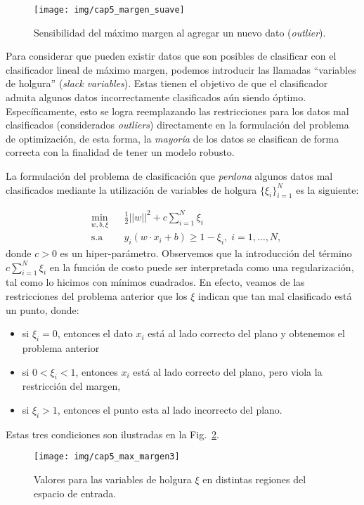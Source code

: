 \begin{figure}[ht]
    \centering
    \texttt{[image: img/cap5\_margen\_suave]}
    \caption{Sensibilidad del máximo margen al agregar un nuevo dato (\emph{outlier}).}
    \label{fig:svm_softmargin}
\end{figure}

Para considerar que pueden existir datos que son posibles de clasificar con el clasificador lineal de máximo margen, podemos introducir las llamadas ``variables de holgura'' (\emph{slack variables}). Estas tienen el objetivo de que el clasificador admita algunos datos incorrectamente clasificados aún siendo óptimo. Específicamente, esto se logra reemplazando las restricciones para los datos mal clasificados (considerados \emph{outliers}) directamente en la formulación del problema de optimización, de esta forma, la \textit{mayoría} de los datos se clasifican de forma correcta con la finalidad de tener un modelo robusto.

La formulación del problema de clasificación que \emph{perdona} algunos datos mal clasificados mediante la utilización de variables de holgura $\{\xi_i\}_{i=1}^N$ es la siguiente:

\begin{equation*}
\begin{aligned}
& \underset{w,b, \xi}{\text{min}}
& & \frac{1}{2}||w||^2 + c\sum\limits_{i=1}^{N} \xi_i \\
& \text{s.a}
& & y_i (w\cdot x_i +b) \geq 1 - \xi_i, \; i = 1, \ldots, N,
\end{aligned}
\end{equation*}
donde $c>0$ es un hiper-parámetro. Observemos que la introducción del término $c\sum\limits_{i=1}^{N} \xi_i$ en la función de costo puede ser interpretada como una regularización, tal como lo hicimos con mínimos cuadrados. En efecto, veamos de las restricciones del problema anterior que los $\xi$ indican que tan mal clasificado está un punto, donde: 
\begin{itemize}
    \item si $\xi_i = 0$, entonces el dato $x_i$ está al lado correcto del plano y obtenemos el problema anterior
    \item si $0<\xi_i <1$, entonces $x_i$ está al lado correcto del plano, pero viola la restricción del margen, 
    \item si $\xi_i>1$, entonces el punto esta al lado incorrecto del plano.
\end{itemize}
Estas tres condiciones son ilustradas en la Fig.~\ref{fig:soft_margin}.
\begin{figure}[ht]
    \centering
    \texttt{[image: img/cap5\_max\_margen3]}
    \caption{Valores para las variables de holgura $\xi$ en distintas regiones del espacio de entrada.}
    \label{fig:soft_margin}
\end{figure}

